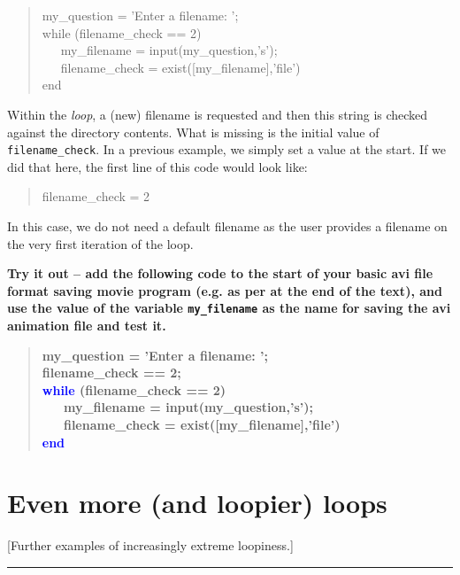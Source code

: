 \documentclass{tufte-book} %
\newenvironment{docspec}{\begin{quotation}\ttfamily\parskip0pt\parindent0pt\ignorespaces}{\end{quotation}}
\newenvironment{docspecbold}{\begin{quotation}\ttfamily\bfseries\parskip0pt\parindent0pt\ignorespaces}{\end{quotation}}
\begin{document}
\begin{docspec}
my\_question = 'Enter a filename: ';
\\while (filename\_check == 2)
\\ \ \ \ my\_filename = input(my\_question,'s');
\\ \ \ \ filename\_check = exist([my\_filename],'file')
\\end
\end{docspec}

Within the \textit{loop}, a (new) filename is requested and then this string is checked against the directory contents. What is missing is the initial value of \texttt{filename\_check}. In a previous example, we simply set a value at the start. If we did that here, the first line of this code would look like: 

\begin{docspec}
filename\_check = 2
\end{docspec}

In this case, we do not need a default filename as the user provides a filename on the very first iteration of the loop.

\textbf{Try it out -- add the following code to the start of your basic avi file format saving movie program (e.g. as per at the end of the text), and use the value of the variable \texttt{my\_filename} as the name for saving the avi animation file and test it.}

\begin{docspecbold}
my\_question = 'Enter a filename: ';
\\filename\_check == 2;
\\\textcolor{blue}{while} (filename\_check == 2)
\\ \ \ \ my\_filename = input(my\_question,'s');
\\ \ \ \ filename\_check = exist([my\_filename],'file')
\\\textcolor{blue}{end}
\end{docspecbold}


\section{Even more (and loopier) loops}

[Further examples of increasingly extreme loopiness.]


\vspace{1mm}
\noindent\rule{4cm}{0.5pt}
\vspace{-2mm}
\end{document}
